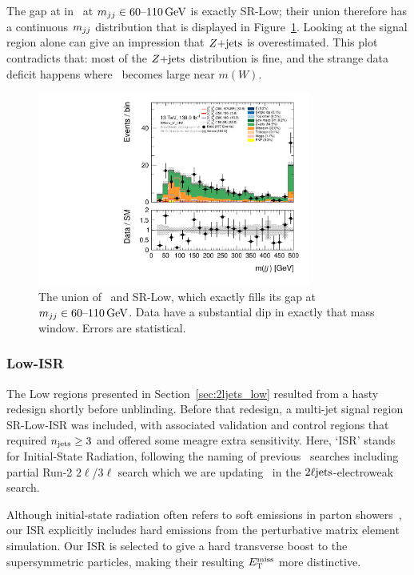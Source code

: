 The gap at in \crz\ at $\mjj \in 60\textrm{--}110\,\eV[G]$ is exactly SR-Low;
their union therefore has a continuous $\mjj$ distribution that is displayed
in Figure~\ref{fig:2ljets_low_sr_or_cr_region}.
Looking at the signal region alone can give an impression that $\zjets$ is
overestimated.
This plot contradicts that: most of the $\zjets$ distribution is fine, and
the strange data deficit happens where \diboson\ becomes large near $m(W)$.

\begin{figure}[tp]
\centering
\includegraphics[width=0.8\textwidth]{figures/2ljets_low_mjj_SRLow_or_CRZ.pdf}
\caption[
The union of CR-Z and SR-Low
]{%
The union of \crz\ and SR-Low, which exactly fills its gap at
$\mjj \in 60\textrm{--}110\,\eV[G]$.
Data have a substantial dip in exactly that mass window.
Errors are statistical.
}
\label{fig:2ljets_low_sr_or_cr_region}
\end{figure}


\subsubsection{Low-ISR}
\label{sec:2ljets_low_isr}
The Low regions presented in Section~\ref{sec:2ljets_low} resulted from a
hasty redesign shortly before unblinding.
Before that redesign, a multi-jet signal region SR-Low-ISR was included,
with associated validation and control regions
that required $\njet \geq 3$ and offered some meagre extra sensitivity.
Here, `ISR' stands for Initial-State Radiation, following the naming
of previous \atlas\ searches including partial Run-2 $2\ell$/$3\ell$
search which we are updating~\cite{atlas_23l_SUSY_2016_24} in the
$\twoljets$-electroweak search.

Although initial-state radiation often refers to soft emissions in
parton showers~\cite{corcella2000initial, bewick2022initial},
our ISR explicitly includes hard emissions from the perturbative matrix element
simulation.
Our ISR is selected to give a hard transverse boost to the supersymmetric
particles, making their resulting $\met$ more distinctive.

